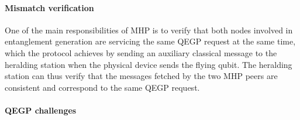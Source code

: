 \paragraph{Mismatch verification}

One of the main responsibilities of MHP is to verify that both nodes involved in entanglement
generation are servicing the same QEGP request at the same time, which the protocol achieves by
sending an auxiliary classical message to the heralding station when the physical device sends the
flying qubit. The heralding station can thus verify that the messages fetched by the two MHP peers
are consistent and correspond to the same QEGP request.

\paragraph{QEGP challenges}

